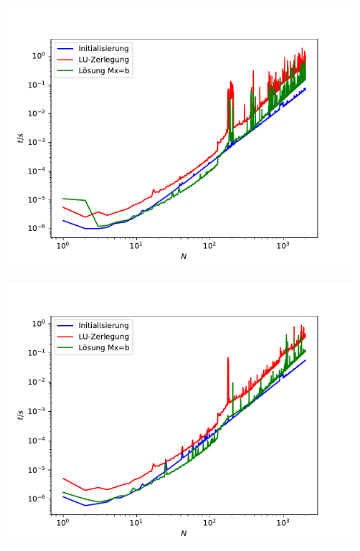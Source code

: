 \documentclass{scrartcl}
\begin{document}
		\begin{figure}[h]
		\centering
		\begin{subfigure}{0.8\textwidth}
		\includegraphics[width=\textwidth]{A2/build/timers_lin.pdf}
		\end{subfigure}
		\begin{subfigure}{0.4\textwidth}
		\includegraphics[width=\textwidth]{A2/Dann_halt_so/timers_lin_PC.pdf}
		\end{subfigure}
		\begin{subfigure}{0.4\textwidth}

\end{subfigure}
\end{figure}
\end{document}
